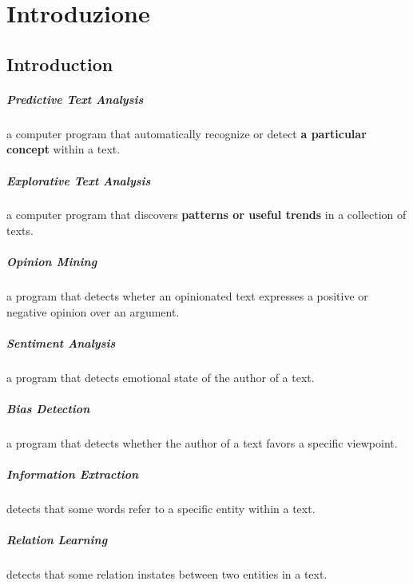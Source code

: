 \chapter{Introduzione}

\section{Introduction}

\paragraph{Predictive Text Analysis} a computer program that automatically recognize or detect \textbf{a particular concept} within a text.

\paragraph{Explorative Text Analysis} a computer program that discovers \textbf{patterns or useful trends} in a collection of texts.

\paragraph{Opinion Mining} a program that detects wheter an opinionated text expresses a positive or negative opinion over an argument.

\paragraph{Sentiment Analysis} a program that detects emotional state of the author of a text.

\paragraph{Bias Detection} a program that detects whether the author of a text favors a specific viewpoint.

\paragraph{Information Extraction} detects that some words refer to a specific entity within a text.

\paragraph{Relation Learning} detects that some relation instates between two entities in a text.

